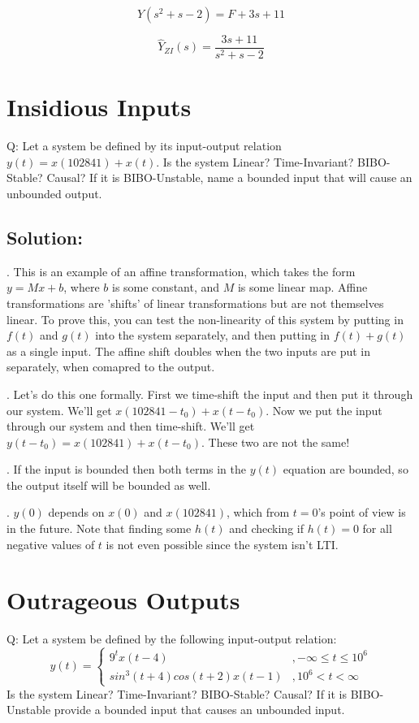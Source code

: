 \documentclass{article}
\begin{document}
$$Y(s^2 + s - 2) = F + 3s + 11$$

$$\boxed{\hat{Y}_{ZI}(s) = \frac{3s + 11}{s^2 + s - 2}}$$

\newpage

\section{Insidious Inputs}

Q: Let a system be defined by its input-output relation $y(t) = x(102841) + x(t)$. Is the system Linear? Time-Invariant? BIBO-Stable? Causal? If it is BIBO-Unstable, name a bounded input that will cause an unbounded output.

\subsection{Solution:}

. This is an example of an affine transformation, which takes the form $y = Mx + b$, where $b$ is some constant, and $M$ is some linear map. Affine transformations are 'shifts' of linear transformations but are not themselves linear. To prove this, you can test the non-linearity of this system by putting in $f(t)$ and $g(t)$ into the system separately, and then putting in $f(t)+g(t)$ as a single input. The affine shift doubles when the two inputs are put in separately, when comapred to the output.

. Let's do this one formally. First we time-shift the input and then put it through our system. We'll get $x(102841 - t_0) + x(t - t_0)$. Now we put the input through our system and then time-shift. We'll get $y(t-t_0) = x(102841) + x(t-t_0)$. These two are not the same!

. If the input is bounded then both terms in the $y(t)$ equation are bounded, so the output itself will be bounded as well.

. $y(0)$ depends on $x(0)$ and $x(102841)$, which from $t = 0$'s point of view is in the future. Note that finding some $h(t)$ and checking if $h(t) = 0$ for all negative values of $t$ is not even possible since the system isn't LTI.


\section{Outrageous Outputs}

Q: Let a system be defined by the following input-output relation:
$$y(t) =
    \begin{cases}
      9^t x(t-4) & ,-\infty \leq t \leq 10^6\\
      sin^3(t+4) cos(t+2) x(t-1) & ,10^6 < t < \infty
    \end{cases}$$    
Is the system Linear? Time-Invariant? BIBO-Stable? Causal? If it is BIBO-Unstable provide a bounded input that causes an unbounded input.
\end{document}
